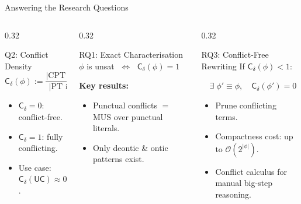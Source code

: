 \documentclass[9pt,aspectratio=169]{beamer}
\newcommand{\dpnf}{\ensuremath{\mathsf{DPNF}}}
\newcommand{\cd}{\ensuremath{\mathsf{C_\delta}}\xspace}
\newcommand{\UC}{\ensuremath{\mathsf{UC}}\xspace}
\begin{document}
\begin{frame}{Answering the Research Questions}
\small
\begin{columns}[T]
  \begin{column}{0.32\textwidth}
  \begin{block}{Q2: Conflict Density}
    \[
    \cd(\phi) := \frac{|\text{CPT in } \dpnf(\phi)|}{|\text{PT in } \dpnf(\phi)|}
    \]
    \begin{itemize}\setlength\itemsep{2pt}
      \item $\cd = 0$: conflict-free.
      \item $\cd = 1$: fully conflicting.
      \item Use case: $\cd(\UC) \approx 0.81$.
    \end{itemize}
  \end{block}
\end{column}
\begin{column}{0.32\textwidth}
  \begin{block}{RQ1: Exact Characterisation}
    \centering
    \vspace{2mm}
    $\phi$ is unsat $\;\Longleftrightarrow\;$ $\cd(\phi) = 1$
    \vspace{2mm}

    \raggedright
    \textbf{Key results:}
    \begin{itemize}\setlength\itemsep{2pt}
      \item Punctual conflicts $=$ MUS over punctual literals.
      \item Only deontic \& ontic patterns exist.
    \end{itemize}
  \end{block}
\end{column}

\begin{column}{0.32\textwidth}
  \begin{block}{RQ3: Conflict-Free Rewriting}
    If $\cd(\phi) < 1$:
    
      $\quad \exists\;\phi' \equiv \phi,\quad \cd(\phi') = 0$
    
    \begin{itemize}\setlength\itemsep{2pt}
      \item Prune conflicting terms.
      \item Compactness cost: up to $\mathcal{O}(2^{|\phi|})$.
      \item Conflict calculus for manual big-step reasoning.
    \end{itemize}
  \end{block}
\end{column}
\end{columns}
\end{frame}
\end{document}
